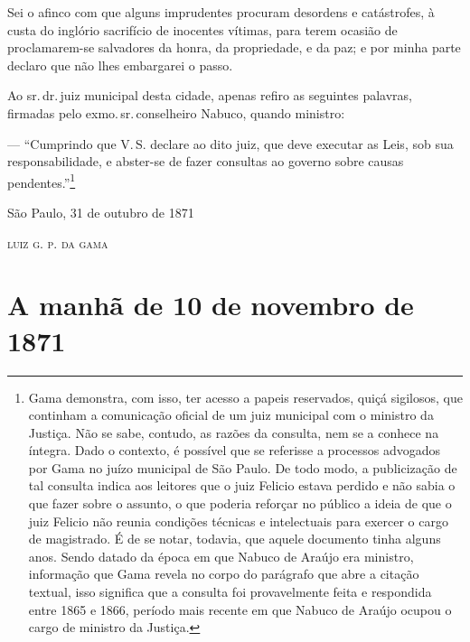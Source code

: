 Sei o afinco com que alguns imprudentes procuram desordens e
catástrofes, à custa do inglório sacrifício de inocentes vítimas, para
terem ocasião de proclamarem-se salvadores da honra, da propriedade, e
da paz; e por minha parte declaro que não lhes embargarei o passo.

Ao sr.\,dr.\,juiz municipal desta cidade, apenas refiro as seguintes
palavras, firmadas pelo exmo.\,sr.\,conselheiro Nabuco, quando ministro:

--- ``Cumprindo que V.\,S. declare ao dito juiz, que deve executar as Leis,
sob sua responsabilidade, e abster-se de fazer consultas ao governo
sobre causas pendentes.''\footnote{ Gama demonstra, com isso, ter acesso
  a papeis reservados, quiçá sigilosos, que continham a comunicação
  oficial de um juiz municipal com o ministro da Justiça. Não se sabe,
  contudo, as razões da consulta, nem se a conhece na íntegra. Dado o
  contexto, é possível que se referisse a processos advogados por Gama
  no juízo municipal de São Paulo. De todo modo, a publicização de tal
  consulta indica aos leitores que o juiz Felicio estava perdido e não
  sabia o que fazer sobre o assunto, o que poderia reforçar no público a
  ideia de que o juiz Felicio não reunia condições técnicas e
  intelectuais para exercer o cargo de magistrado. É de se notar,
  todavia, que aquele documento tinha alguns anos. Sendo datado da época
  em que Nabuco de Araújo era ministro, informação que Gama revela no
  corpo do parágrafo que abre a citação textual, isso significa que a
  consulta foi provavelmente feita e respondida entre 1865 e 1866,
  período mais recente em que Nabuco de Araújo ocupou o cargo de
  ministro da Justiça.}

\begin{flushright}
São Paulo, 31 de outubro de 1871

\textsc{luiz g. p. da gama}
\end{flushright}

\part{A manhã de 10 de novembro de 1871}

